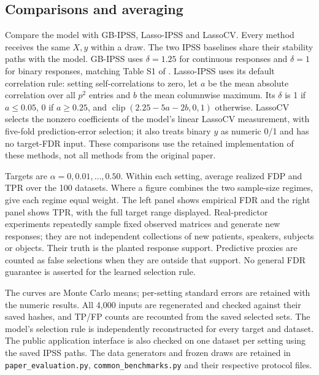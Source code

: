 \documentclass[10pt,letterpaper]{article}
\newcommand{\code}[1]{\nolinkurl{#1}}
\begin{document}
\subsection{Comparisons and averaging}
Compare the model with GB-IPSS, Lasso-IPSS and LassoCV. Every method
receives the same $X,y$ within a draw. The two IPSS baselines share their
stability paths with the model. GB-IPSS uses $\delta=1.25$ for continuous
responses and $\delta=1$ for binary responses, matching Table S1 of
\cite{ipssgb}. Lasso-IPSS uses its default correlation rule: setting
self-correlations to zero, let $a$ be the mean absolute correlation over
all $p^2$ entries and $b$ the mean columnwise maximum. Its $\delta$ is 1
if $a\le0.05$, 0 if $a\ge0.25$, and
$\operatorname{clip}(2.25-5a-2b,0,1)$ otherwise. LassoCV selects the
nonzero coefficients of the model's linear LassoCV measurement, with
five-fold prediction-error selection; it also treats binary $y$ as numeric
0/1 and has no target-FDR input. These comparisons use the retained
implementation of these methods, not all methods from the original paper.

Targets are $\alpha=0,0.01,\ldots,0.50$. Within each setting, average
realized FDP and TPR over the 100 datasets. Where a figure combines the
two sample-size regimes, give each regime equal weight. The left panel
shows empirical FDR and the right panel shows TPR, with the full target
range displayed. Real-predictor experiments repeatedly sample fixed
observed matrices and generate new responses; they are not independent
collections of new patients, speakers, subjects or objects. Their truth
is the planted response support. Predictive proxies are counted as false
selections when they are outside that support. No general FDR guarantee
is asserted for the learned selection rule.

The curves are Monte Carlo means; per-setting standard errors are retained
with the numeric results. All 4,000 inputs are regenerated and checked
against their saved hashes, and TP/FP counts are recounted from the saved
selected sets. The model's selection rule is independently reconstructed
for every target and dataset. The public application interface is also
checked on one dataset per setting using the saved IPSS paths. The data
generators and frozen draws are retained in \code{paper_evaluation.py},
\code{common_benchmarks.py} and their respective protocol files.
\end{document}
